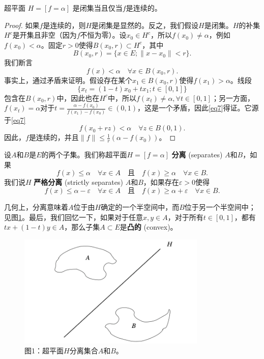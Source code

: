 \begin{proposition}\label{proposition1.5}
超平面 $H = [f = \alpha]$ 是闭集当且仅当$f$是连续的。
\end{proposition}
\begin{proof}
如果$f$是连续的，则$H$是闭集是显然的。反之，我们假设$H$是闭集。$H$的补集$H^c$是开集且非空（因为$f$不恒为零）。设$x_0 \in H^c$，所以$f(x_0) \neq \alpha$，例如$f(x_0) < \alpha$。固定$r > 0$使得$B(x_0, r) \subset H^c$，其中
\[ B(x_0, r) = \{x \in E; \|x-x_0\| < r \}. \]
我们断言
\begin{equation}\label{eq7}
f(x) < \alpha \quad \forall x \in B(x_0, r).
\end{equation}
事实上，通过矛盾来证明。假设存在某个$x_1 \in B(x_0, r)$使得$f(x_1) > \alpha$。线段
\[ \{x_t = (1-t)x_0 + tx_1; t \in [0, 1]\} \]
包含在$B(x_0, r)$中，因此也在$H^c$中，所以$f(x_t) \neq \alpha, \forall t \in [0, 1]$；另一方面，$f(x_t) = \alpha$对于$t = \frac{\alpha - f(x_0)}{f(x_1) - f(x_0)} \in (0, 1)$，这是一个矛盾，因此\eqref{eq7}得证。它源于\eqref{eq7}
\[ f(x_0+rz) < \alpha \quad \forall z \in B(0, 1). \]
因此，$f$是连续的，并且$\|f\| \leq \frac{1}{r}(\alpha - f(x_0))$。
\end{proof}

\begin{definition}
设$A$和$B$是$E$的两个子集。我们称超平面$H = [f=\alpha]$ \textbf{分离} (separates) $A$和$B$，如果
\[ f(x) \leq \alpha \quad \forall x \in A \quad \text{且} \quad f(x) \geq \alpha \quad \forall x \in B. \]
我们说$H$ \textbf{严格分离} (strictly separates) $A$和$B$，如果存在$\varepsilon > 0$使得
\[ f(x) \leq \alpha - \varepsilon \quad \forall x \in A \quad \text{且} \quad f(x) \geq \alpha + \varepsilon \quad \forall x \in B. \]
\end{definition}
几何上，分离意味着$A$位于由$H$确定的一个半空间中，而$B$位于另一个半空间中；见图\ref{fig:1}。最后，我们回忆一下，如果对于任意$x,y \in A$，对于所有$t \in [0,1]$，都有$tx+(1-t)y \in A$，那么子集$A \subset E$是\textbf{凸的} (convex)。

\begin{figure}[H]
    \centering
    \includegraphics[width=0.8\textwidth]{image/fig1.png}
    \caption{图1：超平面$H$分离集合$A$和$B$。}
    \label{fig:1}
\end{figure}

